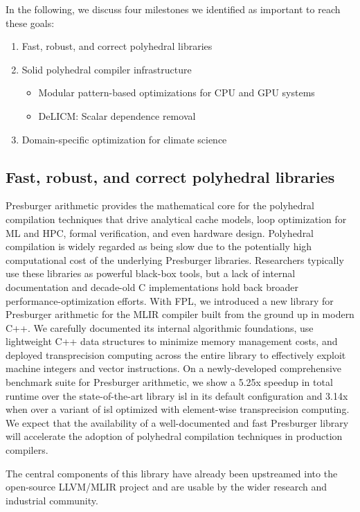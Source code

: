 \documentclass[11pt, manuscript,\review anonymous]{acmart}
\begin{document}
In the following, we discuss four milestones we identified as important to
reach these goals:

\begin{enumerate}
\item Fast, robust, and correct polyhedral libraries
\item Solid polyhedral compiler infrastructure
\begin{itemize}
\item  Modular pattern-based optimizations for CPU and GPU systems
\item 
DeLICM: Scalar dependence removal
\end{itemize}
\item Domain-specific optimization for climate science
\end{enumerate}


\subsection{Fast, robust, and correct polyhedral libraries}
Presburger arithmetic provides the mathematical core for the polyhedral
compilation techniques that drive analytical cache models, loop optimization
for ML and HPC, formal verification, and even hardware design.  Polyhedral
compilation is widely regarded as being slow due to the potentially high
computational cost of the underlying Presburger libraries. Researchers
typically use these libraries as powerful black-box tools, but a lack of
internal documentation and decade-old C implementations hold back broader
performance-optimization efforts. With FPL, we introduced a new library for
Presburger arithmetic for the MLIR compiler built from the ground up in modern
C++. We carefully documented its internal algorithmic foundations, use
lightweight C++ data structures to minimize memory management costs, and deployed
transprecision computing across the entire library to effectively exploit
machine integers and vector instructions. On a newly-developed comprehensive
benchmark suite for Presburger arithmetic, we show a 5.25x speedup in total
runtime over the state-of-the-art library isl in its default configuration and
3.14x when over a variant of isl optimized with element-wise transprecision
computing. We expect that the availability of a well-documented and fast
Presburger library will accelerate the adoption of polyhedral compilation
techniques in production compilers.

The central components of this library have already been upstreamed into the
open-source LLVM/MLIR project and are usable by the wider research and 
industrial community.
\end{document}
